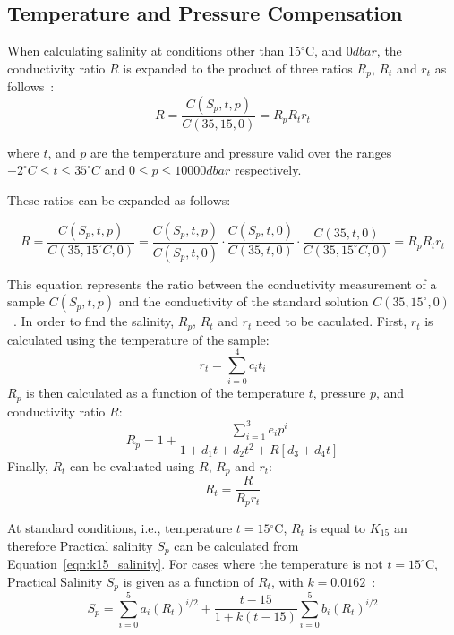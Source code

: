 \subsection{Temperature and Pressure Compensation}
When calculating salinity at conditions other than 15$^\circ$C, and $0dbar$, the conductivity ratio $R$ is expanded to the product of three ratios $R_p$, $R_t$ and $r_t$ as follows~\cite{teos-10}:
\begin{equation}
    R=\frac{C(S_p, t, p)}{C(35, 15, 0)} = R_p R_t r_t
\end{equation}

where $t$, and $p$ are the temperature and pressure valid over the ranges $-2^{\circ}C \leq t \leq 35^{\circ}C$ and $0 \leq p \leq 10 000dbar$ respectively.

These ratios can be expanded as follows:

\begin{equation}
    R = \frac{C(S_p, t, p)}{C(35, 15^{\circ} C, 0)} = \frac{C(S_p, t, p)}{C(S_p, t, 0)} \cdot \frac{C(S_p, t, 0)}{C(35, t, 0)} \cdot \frac{C(35, t, 0)}{C(35, 15^{\circ} C, 0)} = R_p R_t r_t
\end{equation}

This equation represents the ratio between the conductivity measurement of a sample $C(S_p,t,p)$ and the conductivity of the standard solution $C(35, 15^{\circ}, 0)$~\cite{teos-10}. 
In order to find the salinity, $R_p$, $R_t$ and $r_t$ need to be caculated.
First, $r_t$ is calculated using the temperature of the sample:
\begin{equation}
    r_t = \sum_{i=0}^{4} {c_i}{t_i}
\end{equation}
$R_p$ is then calculated as a function of the temperature $t$, pressure $p$, and conductivity ratio $R$:
\begin{equation}
    R_p = 1 + \frac{\sum_{i=1}^{3}{e_i}{p^i}}{1+d_1{t}+d_2{t^2}+R[d_3+d_4 {t}]}
\end{equation}
Finally, $R_t$ can be evaluated using $R$, $R_p$ and $r_t$:
\begin{equation}
    R_t = \frac{R}{{R_p}{r_t}}
\end{equation} 

At standard conditions, i.e., temperature $t=15{^\circ}$C, $R_t$ is equal to $K_{15}$ an therefore Practical salinity $S_p$ can be calculated from Equation~\ref{eqn:k15_salinity}.
For cases where the temperature is not $t=15^\circ$C, Practical Salinity $S_p$ is given as a function of $R_t$, with $k=0.0162$~\cite{teos-10}:
\begin{equation}\label{eqn:salinity_full}
S_p = \sum_{i=0}^{5} a_i {(R_t)}^{i/2} + \frac{t-15}{1+k(t-15)} \sum_{i=0}^{5} b_i {(R_t)}^{i/2}
\end{equation}

